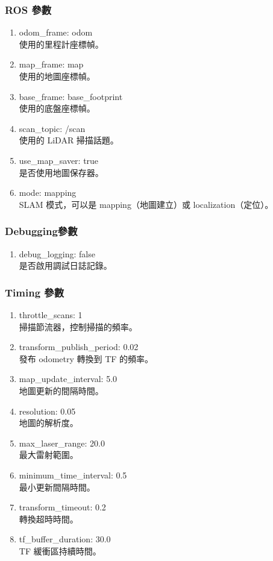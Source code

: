 \subsubsection{ROS 參數}
\begin{enumerate}
    \item odom\_frame: odom
    \\使用的里程計座標幀。
    \item map\_frame: map
    \\使用的地圖座標幀。
    \item base\_frame: base\_footprint
    \\使用的底盤座標幀。
    \item scan\_topic: /scan
    \\使用的 LiDAR 掃描話題。
    \item use\_map\_saver: true
    \\是否使用地圖保存器。
    \item mode: mapping
    \\SLAM 模式，可以是 mapping（地圖建立）或 localization（定位）。
\end{enumerate}
\subsubsection{Debugging參數}
\begin{enumerate}
    \item debug\_logging: false
    \\是否啟用調試日誌記錄。
\end{enumerate}
\subsubsection{Timing 參數}
\begin{enumerate}
    \item throttle\_scans: 1
    \\掃描節流器，控制掃描的頻率。
    \item transform\_publish\_period: 0.02
    \\發布 odometry 轉換到 TF 的頻率。
    \item map\_update\_interval: 5.0
    \\地圖更新的間隔時間。
    \item resolution: 0.05
    \\地圖的解析度。
    \item max\_laser\_range: 20.0
    \\最大雷射範圍。
    \item minimum\_time\_interval: 0.5
    \\最小更新間隔時間。
    \item transform\_timeout: 0.2
    \\轉換超時時間。
    \item tf\_buffer\_duration: 30.0
    \\TF 緩衝區持續時間。
\end{enumerate}
